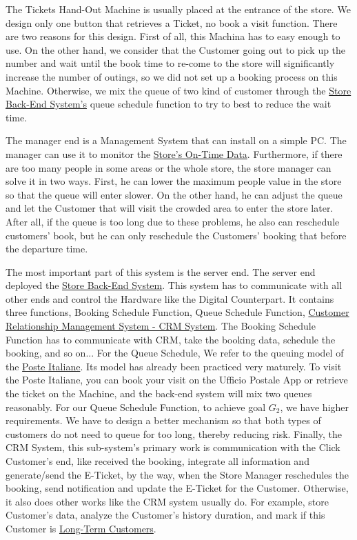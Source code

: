 \documentclass[a4paper,12pt]{report}
\begin{document}
The Tickets Hand-Out Machine is usually placed at the entrance of the store. We design only one button that retrieves a Ticket, no book a visit function. There are two reasons for this design. First of all, this Machina has to easy enough to use. On the other hand, we consider that the Customer going out to pick up the number and wait until the book time to re-come to the store will significantly increase the number of outings, so we did not set up a booking process on this Machine.  Otherwise, we mix the queue of two kind of customer through the \hyperref[Definitions]{Store Back-End System's} queue schedule function to try to best to reduce the wait time.

The manager end is a Management System that can install on a simple PC. The manager can use it to monitor the \hyperref[Definitions]{Store's On-Time Data}. Furthermore, if there are too many people in some areas or the whole store, the store manager can solve it in two ways. First, he can lower the maximum people value in the store so that the queue will enter slower. On the other hand, he can adjust the queue and let the Customer that will visit the crowded area to enter the store later. After all, if the queue is too long due to these problems, he also can reschedule customers’ book, but he can only reschedule the Customers' booking that before the departure time. 

The most important part of this system is the server end. The server end deployed the \hyperref[Definitions]{Store Back-End System}. This system has to communicate with all other ends and control the Hardware like the Digital Counterpart. It contains three functions, Booking Schedule Function, Queue Schedule Function, \hyperref[Reference documents]{Customer Relationship Management System - CRM System}. The Booking Schedule Function has to communicate with CRM, take the booking data, schedule the booking, and so on... For the Queue Schedule, We refer to the queuing model of the \hyperref[Reference documents]{Poste Italiane}. Its model has already been practiced very maturely. To visit the Poste Italiane, you can book your visit on the Ufficio Postale App or retrieve the ticket on the Machine, and the back-end system will mix two queues reasonably. For our Queue Schedule Function, to achieve goal $G_2$, we have higher requirements. We have to design a better mechanism so that both types of customers do not need to queue for too long, thereby reducing risk. Finally, the CRM System, this sub-system's primary work is communication with the Click Customer's end, like received the booking, integrate all information and generate/send the E-Ticket, by the way, when the Store Manager reschedules the booking, send notification and update the E-Ticket for the Customer. Otherwise, it also does other works like the CRM system usually do. For example, store Customer's data, analyze the Customer's history duration, and mark if this Customer is  \hyperref[Definitions]{Long-Term Customers}.
\end{document}
